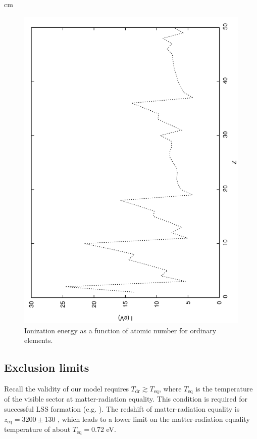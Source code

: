 \documentclass[12pt]{article}
\begin{document}
 cm

%
\begin{figure}[htpb]
    \centering
        \includegraphics[scale=0.5, angle=270]{ionization}
    \caption{Ionization energy as a function of atomic number for ordinary elements.}
    \label{fig:Ionization}
\end{figure}
%
\newpage

\subsection{Exclusion limits}

Recall the validity of our model requires $T _{\text{dr}} \gtrsim T _{\text{eq}}$, where $T _{\text{eq}}$ is the temperature of the visible sector at matter-radiation equality. This condition is required for successful LSS formation (e.g. \cite{volkaspetraki}). The redshift of matter-radiation equality is $z _{\text{eq}} = 3200 \pm 130$ \cite{pdg}, which leads to a lower limit on the matter-radiation equality temperature of about $T _{\text{eq}} = 0.72$ eV.
\end{document}

